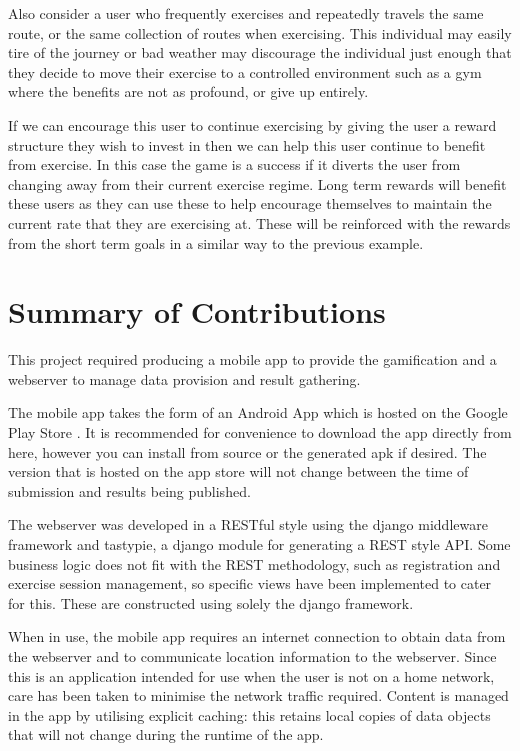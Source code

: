 Also consider a user who frequently exercises and repeatedly travels
the same route, or the same collection of routes when exercising. This
individual may easily tire of the journey or bad weather may
discourage the individual just enough that they decide to move their
exercise to a controlled environment such as a gym where the benefits
are not as profound, or give up entirely. 

If we can encourage this user to continue exercising by giving the
user a reward structure they wish to invest in then we can help this
user continue to benefit from exercise. In this case the game is a
success if it diverts the user from changing away from their current
exercise regime. Long term rewards will benefit these users as they
can use these to help encourage themselves to maintain the current
rate that they are exercising at. These will be reinforced with the
rewards from the short term goals in a similar way to the previous
example. 

\section{Summary of Contributions}

This project required producing a mobile app to provide the
gamification and a webserver to manage data provision and result
gathering. 

The mobile app takes the form of an Android App which is hosted on the
Google Play Store \cite{app_store_link}. It is recommended for
convenience to download the app directly from here, however you can
install from source or the generated apk if desired. The version that
is hosted on the app store will not change between the time of
submission and results being published.

The webserver was developed in a RESTful style using the django
middleware framework\cite{django} and tastypie, a django module for
generating a REST style API\cite{tastypie}. Some business logic does
not fit with the REST methodology, such as registration and exercise
session management, so specific views have been implemented to cater
for this. These are constructed using solely the django framework.

When in use, the mobile app requires an internet connection to obtain
data from the webserver and to communicate location information to the
webserver. Since this is an application intended for use when the user
is not on a home network, care has been taken to minimise the network
traffic required. Content is managed in the app by utilising explicit
caching: this retains local copies of data objects that will not
change during the runtime of the app. 

